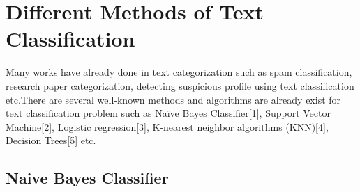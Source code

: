\section{Different Methods of Text Classification}
Many works have already done in text categorization such as spam classification, research paper categorization, detecting suspicious profile using text classification etc.There are several well-known methods and algorithms are already exist for text classification problem such as Naïve Bayes Classifier[1], Support Vector Machine[2], Logistic regression[3], K-nearest neighbor algorithms (KNN)[4], Decision Trees[5] etc.

\subsection{Naive Bayes Classifier}

